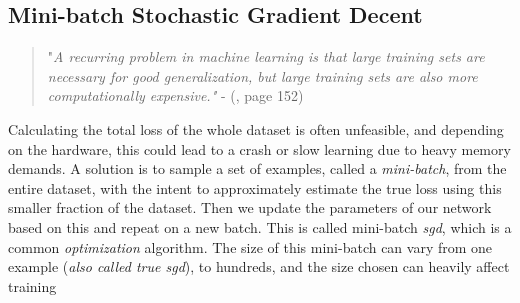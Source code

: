 \subsection{Mini-batch Stochastic Gradient Decent} \label{batch learning}
        \begin{quote}
        "\textit{A recurring problem in machine learning is that large training sets are necessary for good generalization, but large training sets are also more computationally
        expensive."} - (\citeauthor{Goodfellow-et-al-2016_SGD}\citeyear{Goodfellow-et-al-2016_SGD}, page 152)
    \end{quote}
    
    Calculating the total loss of the whole dataset is often unfeasible, and depending on the hardware, this could lead to a crash or slow learning due to
    heavy memory demands. A solution is to sample a set of examples, called a \textit{mini-batch}, from the entire dataset, with the intent to approximately estimate
    the true loss using this smaller fraction of the dataset. Then we update the parameters of our network based on this and repeat on a new batch. This is called mini-batch \textit{\gls{sgd}}, which is a common \textit{optimization} algorithm\cite{Goodfellow-et-al-2016_SGD}. The size of this mini-batch can vary from one example (\textit{also called true \gls{sgd}}), to hundreds, and the size chosen can heavily affect training\cite{wilson2001need_learning_rate}
    
    
    
    
    
